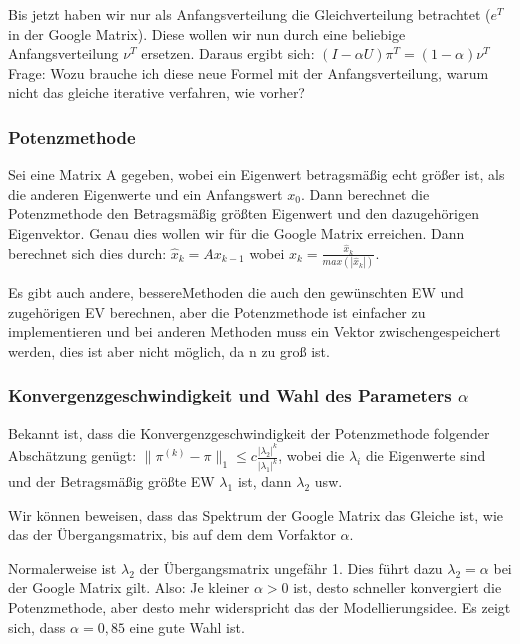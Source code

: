 \documentclass[]{article}
\begin{document}
Bis jetzt haben wir nur als Anfangsverteilung die Gleichverteilung betrachtet ($e^T$ in der Google Matrix). Diese wollen wir nun durch eine beliebige Anfangsverteilung $\nu^T$ ersetzen. Daraus ergibt sich: $(I- \alpha U) \pi^T = (1-\alpha)\nu^T$ \\

Frage: Wozu brauche ich diese neue Formel mit der Anfangsverteilung, warum nicht das gleiche iterative verfahren, wie vorher? 

\subsubsection*{Potenzmethode} 

Sei eine Matrix A gegeben, wobei ein Eigenwert betragsmäßig echt größer ist, als die anderen Eigenwerte und ein Anfangswert $x_0$. Dann berechnet die Potenzmethode den Betragsmäßig größten Eigenwert und den dazugehörigen Eigenvektor. Genau dies wollen wir für die Google Matrix erreichen. Dann berechnet sich dies durch: $\hat{x}_k=A x_{k-1}$ wobei $x_k = \frac{\hat{x}_k}{max(|\hat{x}_k|)}$.

Es gibt auch andere, \glqq bessere\grqq Methoden die auch den gewünschten EW und zugehörigen EV berechnen, aber die Potenzmethode ist einfacher zu implementieren und bei anderen Methoden muss ein Vektor zwischengespeichert werden, dies ist aber nicht möglich, da n zu groß ist. 

\subsubsection{Konvergenzgeschwindigkeit und Wahl des Parameters $\alpha$} 

Bekannt ist, dass die Konvergenzgeschwindigkeit der Potenzmethode folgender Abschätzung genügt: $\| \pi^{(k)} - \pi\|_1 \le c \frac{|\lambda_2|^k}{|\lambda_1|^k}$, wobei die $\lambda_i$ die Eigenwerte sind und der Betragsmäßig größte EW $\lambda_1$ ist, dann $\lambda_2$ usw.   

Wir können beweisen, dass das Spektrum der Google Matrix das Gleiche ist, wie das der Übergangsmatrix, bis auf dem dem Vorfaktor $\alpha $. 

Normalerweise ist $\lambda_2$ der Übergangsmatrix ungefähr 1. Dies führt dazu $\lambda_2 = \alpha$ bei der Google Matrix gilt. Also: Je kleiner $\alpha>0$ ist, desto schneller konvergiert die Potenzmethode, aber desto mehr widerspricht das der Modellierungsidee. Es zeigt sich, dass $\alpha = 0,85$ eine gute Wahl ist.     
\end{document}
